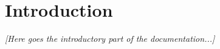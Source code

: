 %
%
%
%


\section{Introduction}
\textit{[Here goes the introductory part of the documentation...]}

